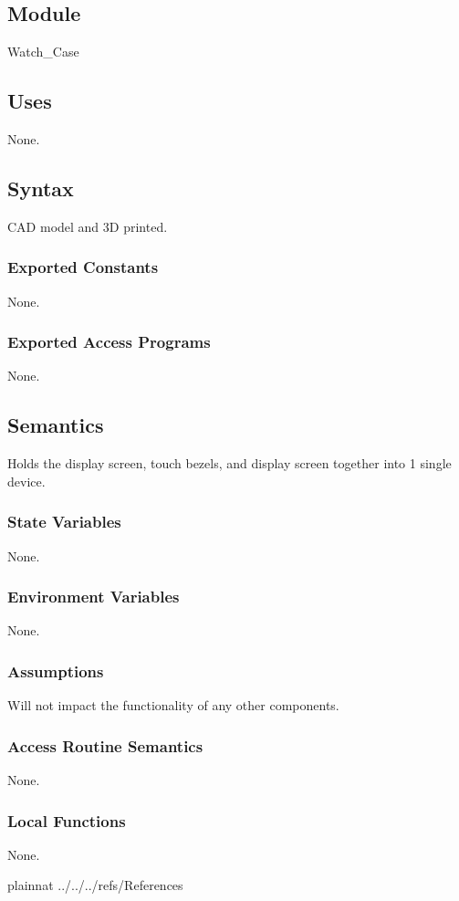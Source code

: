 \documentclass[12pt, titlepage]{article}
\begin{document}
\subsection{Module}

Watch\_Case

\subsection{Uses}
None.

\subsection{Syntax}

CAD model and 3D printed.

\subsubsection{Exported Constants}

None.

\subsubsection{Exported Access Programs}

None.

\subsection{Semantics}

Holds the display screen, touch bezels, and display screen together into 1 single device.

\subsubsection{State Variables}

None.

\subsubsection{Environment Variables}

None.

\subsubsection{Assumptions}

Will not impact the functionality of any other components.

\subsubsection{Access Routine Semantics}

None.

\subsubsection{Local Functions}

None.

\newpage


 {plainnat}
 {../../../refs/References}
\end{document}
